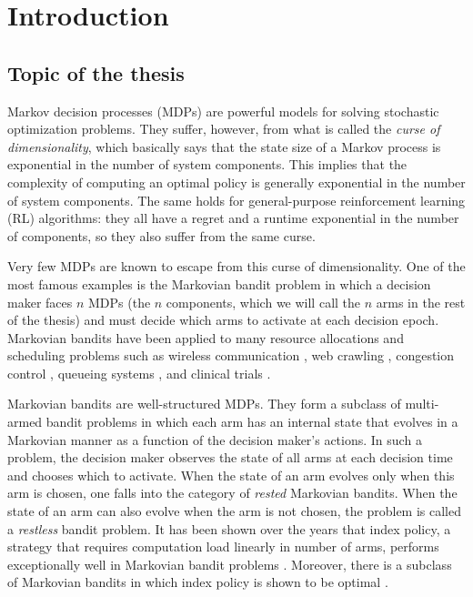 \begingroup
\let\clearpage\relax

\chapter{Introduction}
\label{chapter:introduction}

\section{Topic of the thesis}

Markov decision processes (MDPs) are powerful models for solving stochastic optimization problems. They suffer, however, from what is called the \emph{curse of dimensionality}, which basically says that the state size of a Markov process is exponential in the number of system components. This implies that the complexity of computing an optimal policy is generally exponential in the number of system components. The same holds for general-purpose reinforcement learning (RL) algorithms: they all have a regret and a runtime exponential in the number of components, so they also suffer from the same curse.

Very few MDPs are known to escape from this curse of dimensionality. One of the most famous examples is the Markovian bandit problem in which a decision maker faces $n$ MDPs (the $n$ components, which we will call the $n$ arms in the rest of the thesis) and must decide which arms to activate at each decision epoch.
Markovian bandits have been applied to many resource allocations and scheduling problems such as wireless communication \cite{raghunathan2008index, liu2010indexability, aalto2019whittle}, web crawling \cite{nino2014dynamic, avrachenkov2022whittle}, congestion control \cite{avrachenkov2013congestion, avrachenkov2018impulsive}, queueing systems \cite{glazebrook2009index, aalto2009gittins, archibald2009indexability, aalto2011properties, larranaga2015asymptotically, borkar2017whittle, scully2018soap}, and clinical trials \cite{villar2015multi}.

Markovian bandits are well-structured MDPs.
They form a subclass of multi-armed bandit problems in which each arm has an internal state that evolves in a Markovian manner as a function of the decision maker’s actions.
In such a problem, the decision maker observes the state of all arms at each decision time and chooses which to activate.
When the state of an arm evolves only when this arm is chosen, one falls into the category of \emph{rested} Markovian bandits.
When the state of an arm can also evolve when the arm is not chosen, the problem is called a \emph{restless} bandit problem.
It has been shown over the years that index policy, a strategy that requires computation load linearly in number of arms, performs exceptionally well in Markovian bandit problems \cite{glazebrook2002index, ansell2003whittle, glazebrook2006some, avrachenkov2013congestion, akbarzadeh2019restless}.
Moreover, there is a subclass of Markovian bandits in which index policy is shown to be optimal \cite{gittins1979bandit}.

